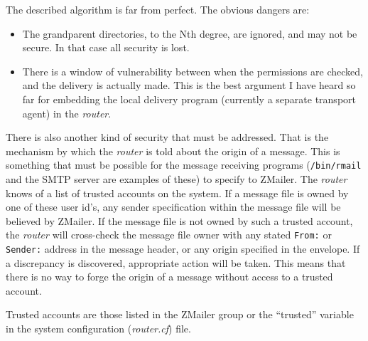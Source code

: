 The described algorithm is far from perfect. The obvious dangers are:
\begin{itemize}\sloppy
\item The grandparent directories, to the Nth degree, are ignored, and may
not be secure. In that case all security is lost.
\item There is a window of vulnerability between when the permissions are
checked, and the delivery is actually made. This is the best argument
I have heard so far for embedding the local delivery program
(currently a separate transport agent) in the {\em router}.
\end{itemize}


There is also another kind of security that must be addressed.  That is the
mechanism by which the {\em router} is told about the origin of a message.  This
is something that must be possible for the message receiving programs
({\tt /bin/rmail} and the SMTP server are examples of these) to specify to
ZMailer. The {\em router} knows of a list of trusted accounts on the system.
If a message file is owned by one of these user id's, any sender specification
within the message file will be believed by ZMailer.  If the message file
is not owned by such a trusted account, the {\em router} will cross-check the
message file owner with any stated {\tt From:} or {\tt Sender:} address 
in the message header, or any origin specified in the envelope.  If a 
discrepancy is discovered, appropriate action will be taken.  This means 
that there is no way to forge the origin of a message without access to a 
trusted account.

Trusted accounts are those listed in the ZMailer group or the ``trusted'' 
variable in the system configuration ({\em router.cf}) file.


